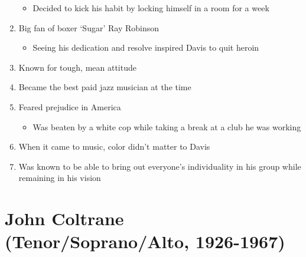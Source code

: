 \documentclass[]{article}
\providecommand{\tightlist}{%
  \setlength{\itemsep}{0pt}\setlength{\parskip}{0pt}}
\begin{document}
\begin{enumerate}
  \begin{itemize}
  \tightlist
  \item
    Decided to kick his habit by locking himself in a room for a week
  \end{itemize}
\item
  Big fan of boxer `Sugar' Ray Robinson

  \begin{itemize}
  \tightlist
  \item
    Seeing his dedication and resolve inspired Davis to quit heroin
  \end{itemize}
\item
  Known for tough, mean attitude
\item
  Became the best paid jazz musician at the time
\item
  Feared prejudice in America

  \begin{itemize}
  \tightlist
  \item
    Was beaten by a white cop while taking a break at a club he was
    working
  \end{itemize}
\item
  When it came to music, color didn't matter to Davis
\item
  Was known to be able to bring out everyone's individuality in his
  group while remaining in his vision
\end{enumerate}

\section{John Coltrane (Tenor/Soprano/Alto,
1926-1967)}\label{john-coltrane-tenorsopranoalto-1926-1967}
\end{document}
